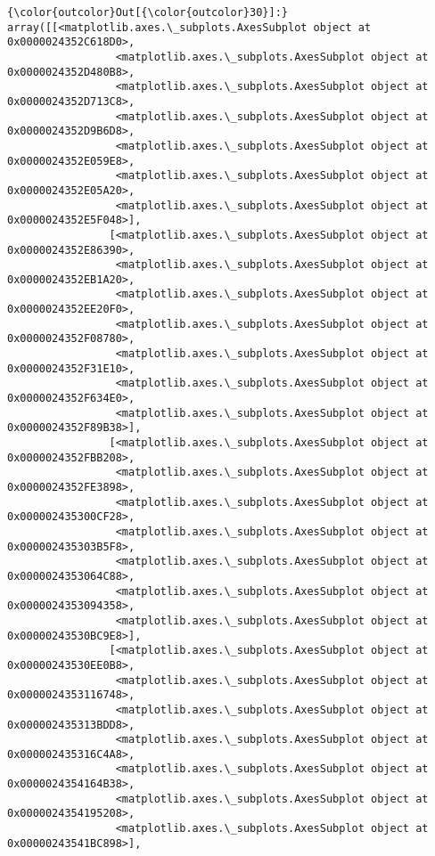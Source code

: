 \documentclass[11pt]{article}
\begin{document}
\begin{Verbatim}[commandchars=\\\{\}]
{\color{outcolor}Out[{\color{outcolor}30}]:} array([[<matplotlib.axes.\_subplots.AxesSubplot object at 0x0000024352C618D0>,
                 <matplotlib.axes.\_subplots.AxesSubplot object at 0x0000024352D480B8>,
                 <matplotlib.axes.\_subplots.AxesSubplot object at 0x0000024352D713C8>,
                 <matplotlib.axes.\_subplots.AxesSubplot object at 0x0000024352D9B6D8>,
                 <matplotlib.axes.\_subplots.AxesSubplot object at 0x0000024352E059E8>,
                 <matplotlib.axes.\_subplots.AxesSubplot object at 0x0000024352E05A20>,
                 <matplotlib.axes.\_subplots.AxesSubplot object at 0x0000024352E5F048>],
                [<matplotlib.axes.\_subplots.AxesSubplot object at 0x0000024352E86390>,
                 <matplotlib.axes.\_subplots.AxesSubplot object at 0x0000024352EB1A20>,
                 <matplotlib.axes.\_subplots.AxesSubplot object at 0x0000024352EE20F0>,
                 <matplotlib.axes.\_subplots.AxesSubplot object at 0x0000024352F08780>,
                 <matplotlib.axes.\_subplots.AxesSubplot object at 0x0000024352F31E10>,
                 <matplotlib.axes.\_subplots.AxesSubplot object at 0x0000024352F634E0>,
                 <matplotlib.axes.\_subplots.AxesSubplot object at 0x0000024352F89B38>],
                [<matplotlib.axes.\_subplots.AxesSubplot object at 0x0000024352FBB208>,
                 <matplotlib.axes.\_subplots.AxesSubplot object at 0x0000024352FE3898>,
                 <matplotlib.axes.\_subplots.AxesSubplot object at 0x000002435300CF28>,
                 <matplotlib.axes.\_subplots.AxesSubplot object at 0x000002435303B5F8>,
                 <matplotlib.axes.\_subplots.AxesSubplot object at 0x0000024353064C88>,
                 <matplotlib.axes.\_subplots.AxesSubplot object at 0x0000024353094358>,
                 <matplotlib.axes.\_subplots.AxesSubplot object at 0x00000243530BC9E8>],
                [<matplotlib.axes.\_subplots.AxesSubplot object at 0x00000243530EE0B8>,
                 <matplotlib.axes.\_subplots.AxesSubplot object at 0x0000024353116748>,
                 <matplotlib.axes.\_subplots.AxesSubplot object at 0x000002435313BDD8>,
                 <matplotlib.axes.\_subplots.AxesSubplot object at 0x000002435316C4A8>,
                 <matplotlib.axes.\_subplots.AxesSubplot object at 0x0000024354164B38>,
                 <matplotlib.axes.\_subplots.AxesSubplot object at 0x0000024354195208>,
                 <matplotlib.axes.\_subplots.AxesSubplot object at 0x00000243541BC898>],

\end{Verbatim}
\end{document}

